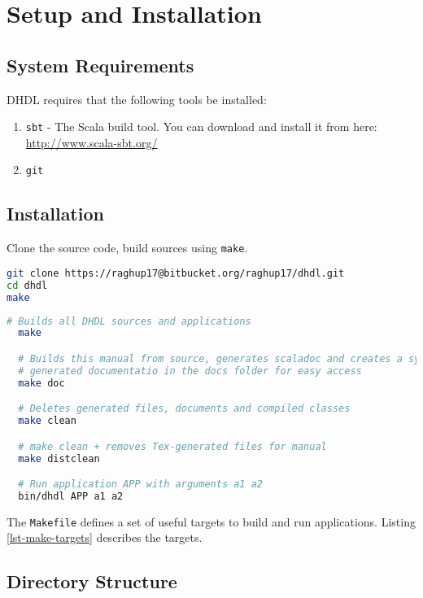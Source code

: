 \section{Setup and Installation}
\subsection{System Requirements}
DHDL requires that the following tools be installed:
\begin{enumerate}
  \item \texttt{sbt} - The Scala build tool. You can download and install it from here: \href{http://www.scala-sbt.org/}{http://www.scala-sbt.org/}
  \item \texttt{git}
\end{enumerate}
\subsection{Installation}
Clone the source code, build sources using \texttt{make}.
\begin{lstlisting}[language=sh, caption=Build and install DHDL]
git clone https://raghup17@bitbucket.org/raghup17/dhdl.git
cd dhdl
make
\end{lstlisting}

\begin{lstlisting}[language=sh, caption=Makefile targets and usage]
  # Builds all DHDL sources and applications
  make

  # Builds this manual from source, generates scaladoc and creates a symlink to the
  # generated documentatio in the docs folder for easy access
  make doc

  # Deletes generated files, documents and compiled classes
  make clean

  # make clean + removes Tex-generated files for manual
  make distclean

  # Run application APP with arguments a1 a2
  bin/dhdl APP a1 a2
\end{lstlisting}
The \texttt{Makefile} defines a set of useful targets to build and run applications.
Listing \ref{lst-make-targets} describes the targets.


\subsection{Directory Structure}
\renewcommand*\DTstylecomment{\rmfamily\color{codegreen}\textsc}
\renewcommand*\DTstyle{\ttfamily\textcolor{codeblue}}
